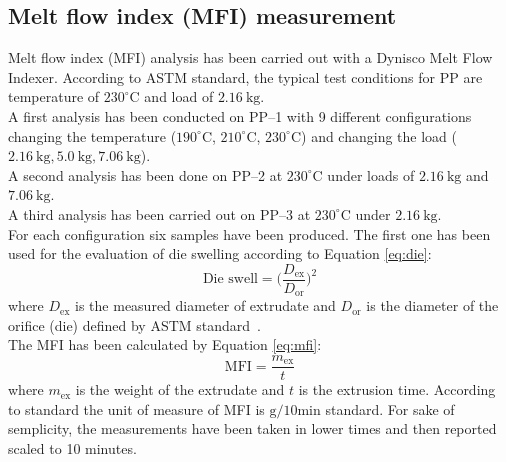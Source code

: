 \documentclass[a4paper, 11pt]{article}
\begin{document}
\subsection{Melt flow index (MFI) measurement}

Melt flow index (MFI) analysis has been carried out with a Dynisco Melt Flow Indexer. According to ASTM standard, the typical test conditions for PP are temperature of $230 ^\circ$C and load of $2.16\  \text{kg}$. \\
A first analysis has been conducted on PP–1 with 9 different configurations changing the temperature ($190 ^\circ$C, $210 ^\circ$C, $230 ^\circ$C) and changing the load ($2.16\ \text{kg}, 5.0\ \text{kg}, 7.06 \ \text{kg}$). \\
A second analysis has been done on PP–2 at $230 ^\circ$C under loads of  $2.16\ \text{kg}$ and  $7.06\ \text{kg}$. \\
A third analysis has been carried out on PP–3 at $230 ^\circ$C under $2.16\ \text{kg}$. \\
For each configuration six samples have been produced. The first one has been used for the evaluation of die swelling according to Equation \ref{eq:die}:
\begin{equation}
\text{Die\ swell} = \bigg(\frac{D_\text{ex}}{D_\text{or}}\bigg)^2
\label{eq:die}
\end{equation}
where $D_\text{ex}$ is the measured diameter of extrudate and $D_\text{or}$ is the diameter of the orifice (die) defined by ASTM standard~\cite{MFI}. \\
The MFI has been calculated by Equation \ref{eq:mfi}: 
\begin{equation}
\text{MFI} = \frac{m_\text{ex}}{t}
\label{eq:mfi}
\end{equation}
where $m_\text{ex}$ is the weight of the extrudate and $t$ is the extrusion time. According to standard the unit of measure of MFI is $\text{g/10min}$ standard. For sake of semplicity, the measurements have been taken in lower times and then reported scaled to 10 minutes. 
\end{document}
